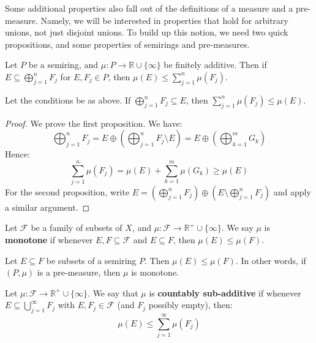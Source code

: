 	Some additional properties also fall out of the definitions of a measure and a pre-measure. Namely, we will be interested 
	in properties that hold for arbitrary unions, not just disjoint unions. To build up this notion, we need two quick propositions, 
	and some properties of semirings and pre-measures. 
	
	\begin{prop}
		Let $P$ be a semiring, and $\mu : P\rightarrow\mathbb R\cup\{\infty\}$ be finitely additive. Then if $E\subseteq
		\bigoplus_{j = 1}^n F_j$ for $E, F_j\in P$, then $\mu(E)\leq\sum_{j = 1}^n\mu(F_j)$.
	\end{prop}
	
	\begin{prop}
		Let the conditions be as above. If $\bigoplus_{j = 1}^n F_j\subseteq E$, then $\sum_{j = 1}^n\mu(F_j)\leq \mu(E)$.
	\end{prop}
	
	\begin{proof}
		We prove the first proposition. We have:
		$$
			\bigoplus_{j = 1}^n F_j = E\oplus \left(\bigoplus_{j = 1}^n F_j\setminus E \right) = E\oplus \left(\bigoplus_{k = 1}^m G_k \right)
		$$
		Hence:
		$$
			\sum_{j = 1}^n\mu(F_j) = \mu(E) + \sum_{k = 1}^m\mu(G_k)\geq\mu(E)
		$$
		For the second proposition, write $E = (\bigoplus_{j = 1}^n F_j)\oplus(E\setminus\bigoplus_{j = 1}^n F_j)$ and apply 
		a similar argument.
	\end{proof}
	
	\begin{definition}[Monotone]
		Let $\mathcal F$ be a family of subsets of $X$, and $\mu : \mathcal F\rightarrow\mathbb R^+\cup\{\infty\}$. We say 
		$\mu$ is \textbf{monotone} if whenever $E, F\subseteq\mathcal F$ and $E\subseteq F$, then $\mu(E)\leq\mu(F)$. 
	\end{definition}
	
	\begin{corollary}
		Let $E\subseteq F$ be subsets of a semiring $P$. Then $\mu(E)\leq\mu(F)$. In other words, if $(P, \mu)$ is a 
		pre-measure, then $\mu$ is monotone.
	\end{corollary}
	
	\begin{definition}
		Let $\mu : \mathcal F\rightarrow\mathbb R^+\cup\{\infty\}$. We say that $\mu$ is \textbf{countably sub-additive} if 
		whenever $E\subseteq\bigcup_{j = 1}^\infty F_j$ with $E, F_j\in\mathcal F$ (and $F_j$ possibly empty), then:
		$$
			\mu(E)\leq\sum_{j = 1}^\infty\mu(F_j)
		$$
	\end{definition}
	
